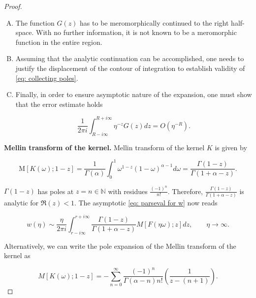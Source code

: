 \documentclass[12pt,twoside]{article}
\theoremstyle{plain}
\theoremstyle{plain}
\theoremstyle{definition}
\theoremstyle{remark}
\numberwithin{equation}{section}
\begin{document}
\begin{proof}
\begin{enumerate}[(A)]
    \item
    \label{enum: first item}
    The function $G(z)$ has to be meromorphically continued to the right half-space. With no further information, it is not known to be a meromorphic function in the entire region.
    
    \item
    \label{enum: second item}
    Assuming that the analytic continuation can be accomplished, one needs to justify the displacement of the contour of integration to establish validity of \eqref{eq: collecting poles}. 
    
    \item
    \label{enum: third item}
    Finally, in order to ensure asymptotic nature of the expansion, one must show that the error estimate holds
    
    $$
    \frac{1}{2 \pi i} \int_{R-i \infty}^{R+i \infty} \eta^{-z} G(z) d z = O(\eta^{-R}).
    $$
    
\end{enumerate}

\vspace{10pt}

\textbf{Mellin transform of the kernel.} Mellin transform of the kernel $K$ is given by

\begin{equation}\label{eq: mellin transform of kernel}
\mathrm{M}[K(\omega) ; 1-z]=\frac{1}{\Gamma(\alpha)} \int_{0}^{1} \omega^{1-z}(1-\omega)^{\alpha-1} d \omega=\frac{\Gamma(1-z)}{\Gamma(1+\alpha-z)}.
\end{equation}

$\Gamma(1-z)$ has poles at $z = n \in \mathbb N$ with residues $\frac{(-1)^{n}}{n !}$. Therefore, $\frac{\Gamma(1-z)}{\Gamma(1+\alpha-z)}$ is analytic for $\Re(z) < 1$. The asymptotic \eqref{eq: parseval for w} now reads 

\begin{equation} \label{eq: ultimate mellin}
w(\eta) \sim \frac{\eta}{2 \pi i} \int_{r-i \infty}^{r+i \infty} \frac{\Gamma(1-z)}{\Gamma(1+\alpha-z)} M[F(\eta \omega) ; z] d z, \qquad \eta \rightarrow \infty.
\end{equation}

\vspace{5pt}

Alternatively, we can write the pole expansion of the Mellin transform of the kernel as

$$
M[K(\omega); 1-z] = - \sum _{n=0} ^\infty \frac{(-1)^n}{\Gamma(\alpha-n) n!} \left(\frac{1}{z-(n+1)}\right).
$$


\end{proof}
\end{document}
